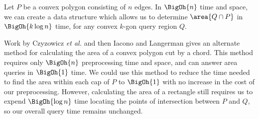 \begin{corollary}
\label{cor:convexp:karea}
Let $P$ be a convex polygon consisting of $n$ edges. In $\BigOh{n}$ time and space, we can create a data structure which allows us to determine $\area{Q \cap P}$ in $\BigOh{k \log{n}}$ time, for any convex $k$-gon query region $Q$.
\end{corollary}

Work by Czyzowicz \textit{et al.}\cite{DBLP:conf/cccg/CzyzowiczCU98} and then Iacono and Langerman\cite{IaconoL00} gives an alternate method for calculating the area of a convex polygon cut by a chord.
This method requires only $\BigOh{n}$ preprocessing time and space, and can answer area queries in $\BigOh{1}$ time.
We could use this method to reduce the time needed to find the area within each cap of $P$ to $\BigOh{1}$ with no increase in the cost of our preprocessing.
However, calculating the area of a rectangle still requires us to expend $\BigOh{\log{n}}$ time locating the points of intersection between $P$ and $Q$, so our overall query time remains unchanged.
